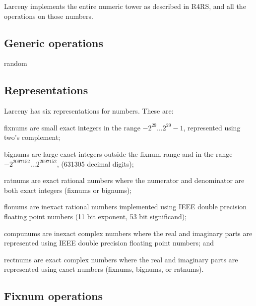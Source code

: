 Larceny implements the entire numeric tower as described in R4RS, and all
the operations on those numbers.

\subsection{Generic operations}

random

\subsection{Representations}

Larceny has six representations for numbers.  These are:

\begin{description}

\item{fixnums} are small exact integers in the range $-2^{29} \ldots 2^{29}-1$,
 represented using two's complement;

\item{bignums} are large exact integers outside the fixnum range and in
 the range $-2^{2097152} \ldots 2^{2097152}$, (631305 decimal digits);

\item{ratnums} are exact rational numbers where the numerator and denominator
are both exact integers (fixnums or bignums);

\item{flonums} are inexact rational numbers implemented using IEEE double
 precision floating point numbers (11 bit exponent, 53 bit significand);

\item{compunums} are inexact complex numbers where the real and
 imaginary parts are represented using IEEE double precision floating point
 numbers; and

\item{rectnums} are exact complex numbers where the real and imaginary
 parts are represented using exact numbers (fixnums, bignums, or ratnums).

\end{description}


\subsection{Fixnum operations}

